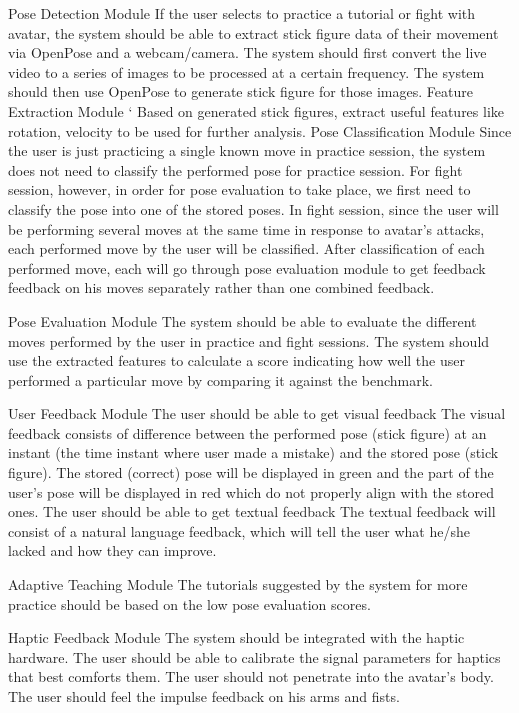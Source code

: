 \begin{outline}
 \1 Pose Detection Module
   \2 If the user selects to practice a tutorial or fight with avatar, the system should be able to extract stick figure data of their movement via OpenPose and a webcam/camera.
     \3 The system should first convert the live video to a series of images to be processed at a certain frequency. 
     \3 The system should then use OpenPose to generate stick figure for those images.
 \1 Feature Extraction Module
 `\2 Based on generated stick figures, extract useful features like rotation, velocity to be used for further analysis.
 \1 Pose Classification Module
  \2 Since the user is just practicing a single known move in practice session, the system does not need to classify the performed pose for practice session. For fight session, however, in order for pose evaluation to take place, we first need to classify the pose into one of the stored poses.
  \2 In fight session, since the user will be performing several moves at the same time in response to avatar’s attacks, each performed move by the user will be classified. After classification of each performed move, each will go through pose evaluation module to get feedback feedback on his moves separately rather than one combined feedback. 
  
 \1 Pose Evaluation Module
  \2 The system should be able to evaluate the different moves performed by the user in practice and fight sessions.
    \3 The system should use the extracted features to calculate a score indicating how well the user performed a particular move by comparing it against the benchmark.

 \1 User Feedback Module
  \2 The user should be able to get visual feedback
    \3 The visual feedback consists of difference between the performed pose (stick figure) at an instant (the time instant where user made a mistake) and the stored pose (stick figure). The stored (correct) pose will be displayed in green and the part of the user’s pose will be displayed in red which do not properly align with the stored ones.  
  \2 The user should be able to get textual feedback 
   \3 The textual feedback will consist of a natural language feedback, which will tell the user what he/she lacked and how they can improve. 

 \1 Adaptive Teaching Module
  \2 The tutorials suggested by the system for more practice should be based on the low pose evaluation scores. 

 \1 Haptic Feedback Module
  \2 The system should be integrated with the haptic hardware.
  \2 The user should be able to calibrate the signal parameters for haptics that best comforts them.
  \2 The user should not penetrate into the avatar’s body.
  \2 The user should feel the impulse feedback on his arms and fists. 
\end{outline}

